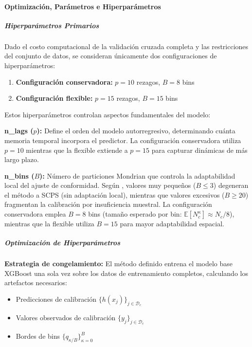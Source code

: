 \paragraph{Optimización, Parámetros e Hiperparámetros}

\subparagraph{Hiperparámetros Primarios}

Dado el costo computacional de la validación cruzada completa y las restricciones del conjunto de datos, se consideran únicamente dos configuraciones de hiperparámetros:

\begin{enumerate}
    \item \textbf{Configuración conservadora:} $p = 10$ rezagos, $B = 8$ bins
    \item \textbf{Configuración flexible:} $p = 15$ rezagos, $B = 15$ bins
\end{enumerate}

Estos hiperparámetros controlan aspectos fundamentales del modelo:

\textbf{n\_lags ($p$):} Define el orden del modelo autorregresivo, determinando cuánta memoria temporal incorpora el predictor. La configuración conservadora utiliza $p=10$ mientras que la flexible extiende a $p=15$ para capturar dinámicas de más largo plazo.

\textbf{n\_bins ($B$):} Número de particiones Mondrian que controla la adaptabilidad local del ajuste de conformidad. Según \textcite{Bostrom2021}, valores muy pequeños ($B \leq 3$) degeneran el método a SCPS (sin adaptación local), mientras que valores excesivos ($B \geq 20$) fragmentan la calibración por insuficiencia muestral. La configuración conservadora emplea $B=8$ bins (tamaño esperado por bin: $\mathbb{E}[N_c^{\kappa}] \approx N_c/8$), mientras que la flexible utiliza $B=15$ para mayor adaptabilidad espacial.


\subparagraph{Optimización de Hiperparámetros}

\textbf{Estrategia de congelamiento:} El método definido entrena el modelo base XGBoost una sola vez sobre los datos de entrenamiento completos, calculando los artefactos necesarios:

\begin{itemize}
    \item Predicciones de calibración $\{h(x_j)\}_{j \in \mathcal{D}_c}$
    \item Valores observados de calibración $\{y_j\}_{j \in \mathcal{D}_c}$
    \item Bordes de bins $\{q_{\kappa/B}\}_{\kappa=0}^{B}$
\end{itemize}

